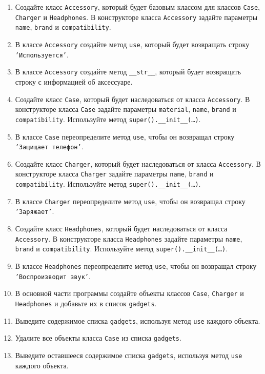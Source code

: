 \begin{enumerate}
\begin{enumerate}
    \item Создайте класс \texttt{Accessory}, который будет базовым классом для классов \texttt{Case}, \texttt{Charger} и \texttt{Headphones}. В конструкторе класса \texttt{Accessory} задайте параметры \texttt{name}, \texttt{brand} и \texttt{compatibility}.
    \item В классе \texttt{Accessory} создайте метод \texttt{use}, который будет возвращать строку \texttt{'Используется'}.
    \item В классе \texttt{Accessory} создайте метод \texttt{\_\_str\_\_}, который будет возвращать строку с информацией об аксессуаре.
    \item Создайте класс \texttt{Case}, который будет наследоваться от класса \texttt{Accessory}. В конструкторе класса \texttt{Case} задайте параметры \texttt{material}, \texttt{name}, \texttt{brand} и \texttt{compatibility}. Используйте метод \texttt{super().\_\_init\_\_(\ldots)}.
    \item В классе \texttt{Case} переопределите метод \texttt{use}, чтобы он возвращал строку \texttt{'Защищает телефон'}.
    \item Создайте класс \texttt{Charger}, который будет наследоваться от класса \texttt{Accessory}. В конструкторе класса \texttt{Charger} задайте параметры \texttt{name}, \texttt{brand} и \texttt{compatibility}. Используйте метод \texttt{super().\_\_init\_\_(\ldots)}.
    \item В классе \texttt{Charger} переопределите метод \texttt{use}, чтобы он возвращал строку \texttt{'Заряжает'}.
    \item Создайте класс \texttt{Headphones}, который будет наследоваться от класса \texttt{Accessory}. В конструкторе класса \texttt{Headphones} задайте параметры \texttt{name}, \texttt{brand} и \texttt{compatibility}. Используйте метод \texttt{super().\_\_init\_\_(\ldots)}.
    \item В классе \texttt{Headphones} переопределите метод \texttt{use}, чтобы он возвращал строку \texttt{'Воспроизводит звук'}.
    \item В основной части программы создайте объекты классов \texttt{Case}, \texttt{Charger} и \texttt{Headphones} и добавьте их в список \texttt{gadgets}.
    \item Выведите содержимое списка \texttt{gadgets}, используя метод \texttt{use} каждого объекта.
    \item Удалите все объекты класса \texttt{Case} из списка \texttt{gadgets}.
    \item Выведите оставшееся содержимое списка \texttt{gadgets}, используя метод \texttt{use} каждого объекта.

\end{enumerate}
\end{enumerate}
